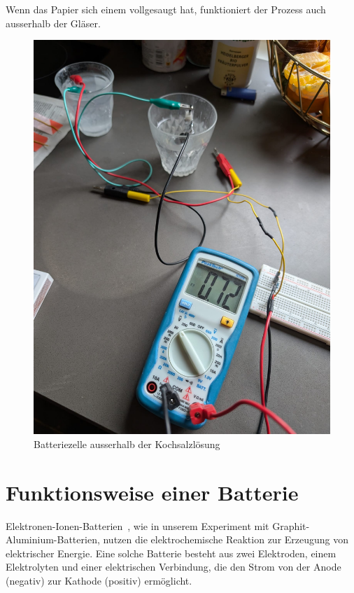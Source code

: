 \documentclass[ngerman, a4paper,12pt]{article}
\begin{document}
\noindent Wenn das Papier sich einem vollgesaugt hat, funktioniert der Prozess auch ausserhalb der Gläser.
\begin{figure}[htbp]
	\centering
	\includegraphics[height=0.3\textheight]{Bild15.jpg}
	\caption{Batteriezelle ausserhalb der Kochsalzlösung}\label{fig:bild15}
\end{figure}
\newpage

\section{Funktionsweise einer Batterie}

Elektronen-Ionen-Batterien~, wie in unserem Experiment mit Graphit-Aluminium-Batterien, nutzen die elektrochemische Reaktion zur Erzeugung von elektrischer Energie. Eine solche Batterie besteht aus zwei Elektroden, einem Elektrolyten und einer elektrischen Verbindung, die den Strom von der Anode (negativ) zur Kathode (positiv) ermöglicht.
\end{document}
